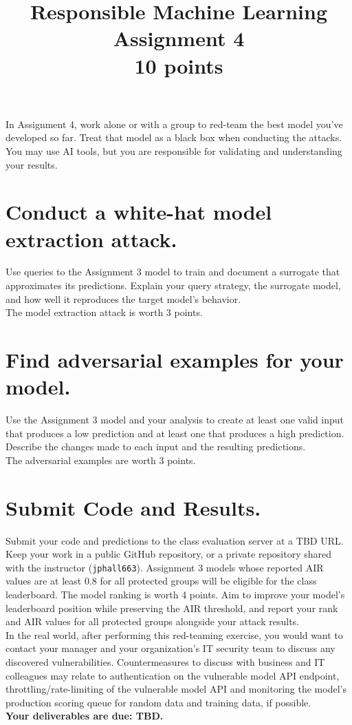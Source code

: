 \documentclass[fleqn]{article}
\title{Responsible Machine Learning\\\Large{Assignment 4}\\\Large{10 points}}
\begin{document}
\maketitle

\noindent In Assignment 4, work alone or with a group to red-team the best model you've developed so far. Treat that model as a black box when conducting the attacks. You may use AI tools, but you are responsible for validating and understanding your results.

\section{Conduct a white-hat model extraction attack.}

Use queries to the Assignment 3 model to train and document a surrogate that approximates its predictions. Explain your query strategy, the surrogate model, and how well it reproduces the target model's behavior.\\

\noindent The model extraction attack is worth 3 points.
 
\section{Find adversarial examples for your model.}

Use the Assignment 3 model and your analysis to create at least one valid input that produces a low prediction and at least one that produces a high prediction. Describe the changes made to each input and the resulting predictions.\\

\noindent The adversarial examples are worth 3 points.

\section{Submit Code and Results.}

Submit your code and predictions to the class evaluation server at a TBD URL. Keep your work in a public GitHub repository, or a private repository shared with the instructor (\texttt{jphall663}). Assignment 3 models whose reported AIR values are at least 0.8 for all protected groups will be eligible for the class leaderboard. The model ranking is worth 4 points. Aim to improve your model's leaderboard position while preserving the AIR threshold, and report your rank and AIR values for all protected groups alongside your attack results.\\

\noindent In the real world, after performing this red-teaming exercise, you would want to contact your manager and your organization's IT security team to discuss any discovered vulnerabilities. Countermeasures to discuss with business and IT colleagues may relate to authentication on the vulnerable model API endpoint, throttling/rate-limiting of the vulnerable model API and monitoring the model's production scoring queue for random data and training data, if possible.\\

\noindent \textbf{Your deliverables are due: TBD.}
\end{document}
